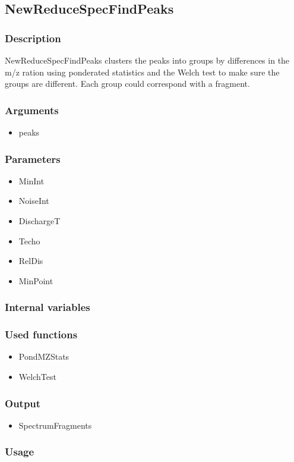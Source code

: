 \subsection{NewReduceSpecFindPeaks}
\subsubsection{Description}

NewReduceSpecFindPeaks clusters the peaks into groups by differences in the m/z ration using ponderated statistics and the Welch test to make sure the groups are different. Each group could correspond with a fragment.

\subsubsection{Arguments}
\begin{itemize}
\item peaks
\end{itemize}
\subsubsection{Parameters}
\begin{itemize}
\item MinInt
\item NoiseInt
\item DischargeT
\item Techo
\item RelDis
\item MinPoint
\end{itemize}
\subsubsection{Internal variables}
\subsubsection{Used functions}
\begin{itemize}
\item PondMZStats
\item WelchTest
\end{itemize}
\subsubsection{Output}
\begin{itemize}
\item SpectrumFragments %
\end{itemize}

\subsubsection{Usage}


